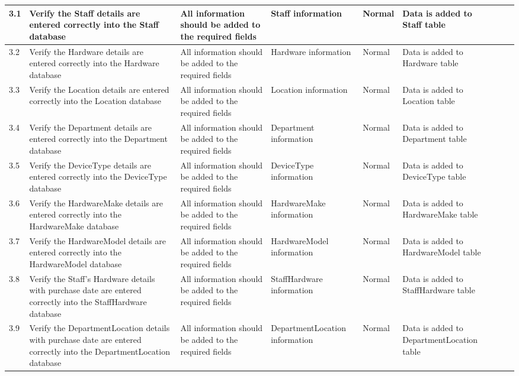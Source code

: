 \begin{landscape}
\begin{center}
\begin{longtable}{|p{1.5cm}|p{2.5cm}|p{2.5cm}|p{2cm}|p{2cm}|p{2cm}|p{2cm}|p{2cm}|}
3.1 & Verify the Staff details are entered correctly into the Staff database & All information should be added to the required fields  & Staff information & Normal& Data is added to Staff table && \\ \hline
3.2 & Verify the Hardware details are entered correctly into the Hardware database & All information should be added to the required fields  &Hardware information & Normal& Data is added to Hardware table && \\ \hline
3.3 & Verify the Location details are entered correctly into the Location database & All information should be added to the required fields  &Location information & Normal& Data is added to Location table && \\ \hline
3.4 & Verify the Department details are entered correctly into the Department database & All information should be added to the required fields  &Department information & Normal& Data is added to Department table && \\ \hline
3.5 & Verify the DeviceType details are entered correctly into the DeviceType database & All information should be added to the required fields  &DeviceType information & Normal& Data is added to DeviceType table && \\ \hline
3.6 & Verify the HardwareMake details are entered correctly into the HardwareMake database & All information should be added to the required fields  &HardwareMake information & Normal& Data is added to HardwareMake table && \\ \hline
3.7 & Verify the HardwareModel details are entered correctly into the HardwareModel database & All information should be added to the required fields  &HardwareModel information & Normal& Data is added to HardwareModel table && \\ \hline
3.8 & Verify the Staff's Hardware details with purchase date are entered correctly into the StaffHardware database & All information should be added to the required fields  &StaffHardware information & Normal& Data is added to StaffHardware table && \\ \hline
3.9 & Verify the DepartmentLocation details with purchase date are entered correctly into the DepartmentLocation database & All information should be added to the required fields  &DepartmentLocation information & Normal& Data is added to DepartmentLocation table && \\ \hline


\end{longtable}
\end{center}
\end{landscape}
